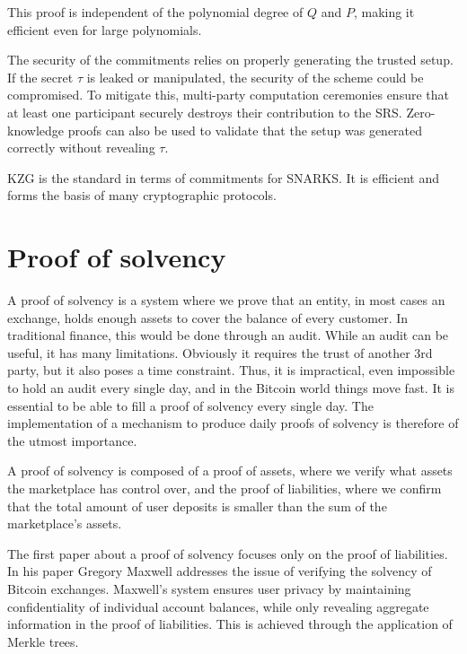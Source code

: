 This proof is independent of the polynomial degree of $Q$ and $P$, making it efficient even for large polynomials.


The security of the commitments relies on properly generating the trusted setup. 
If the secret $\tau$ is leaked or manipulated, the security of the scheme could be compromised. 
To mitigate this, multi-party computation ceremonies ensure that at least one participant securely destroys their contribution to the SRS. 
Zero-knowledge proofs can also be used to validate that the setup was generated correctly without revealing $\tau$.

KZG is the standard in terms of commitments for SNARKS. It is efficient and forms the basis of many cryptographic protocols. \cite{vODC24}


\section{Proof of solvency}

A proof of solvency is a system where we prove that an entity, in most cases an exchange, holds enough assets to cover
the balance of every customer. In traditional finance, this would be done through an audit. While an audit can be useful,
it has many limitations. Obviously it requires the trust of another 3rd party, but it also poses a time constraint. Thus, it is impractical, even impossible
to hold an audit every single day, and in the Bitcoin world things move fast. It is essential to be able to fill a proof of solvency every single day.
The implementation of a mechanism to produce daily proofs of solvency is therefore of the utmost importance.

A proof of solvency is composed of a proof of assets, where we verify what assets the marketplace has control over, and the proof of liabilities, 
where we confirm that the total amount of user deposits is smaller than the sum of the marketplace's assets.

The first paper about a proof of solvency focuses only on the proof of liabilities. In his paper Gregory Maxwell addresses the issue of verifying
the solvency of Bitcoin exchanges. \cite{chainlink_blog}
Maxwell's system ensures user privacy by maintaining confidentiality of individual account balances, while only revealing aggregate information in the proof of liabilities.
This is achieved through the application of Merkle trees.


